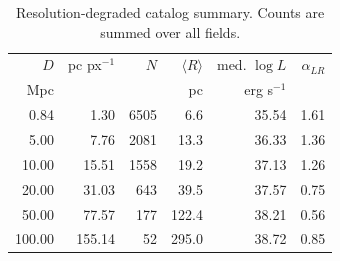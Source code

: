 \begin{table}
\centering
\scriptsize
\setlength{\tabcolsep}{3pt}
\caption{Resolution-degraded catalog summary. Counts are summed over all fields.}
\label{tab:resolution_region_counts}
\begin{tabular}{@{}rrrrrr@{}}
\hline
$D$ & pc px$^{-1}$ & $N$ & $\langle R\rangle$ & med. $\log L$ & $\alpha_{LR}$ \\
Mpc &  &  & pc & erg s$^{-1}$ &  \\
\hline
0.84 & 1.30 & 6505 & 6.6 & 35.54 & 1.61 \\
5.00 & 7.76 & 2081 & 13.3 & 36.33 & 1.36 \\
10.00 & 15.51 & 1558 & 19.2 & 37.13 & 1.26 \\
20.00 & 31.03 & 643 & 39.5 & 37.57 & 0.75 \\
50.00 & 77.57 & 177 & 122.4 & 38.21 & 0.56 \\
100.00 & 155.14 & 52 & 295.0 & 38.72 & 0.85 \\
\hline
\end{tabular}
\end{table}
